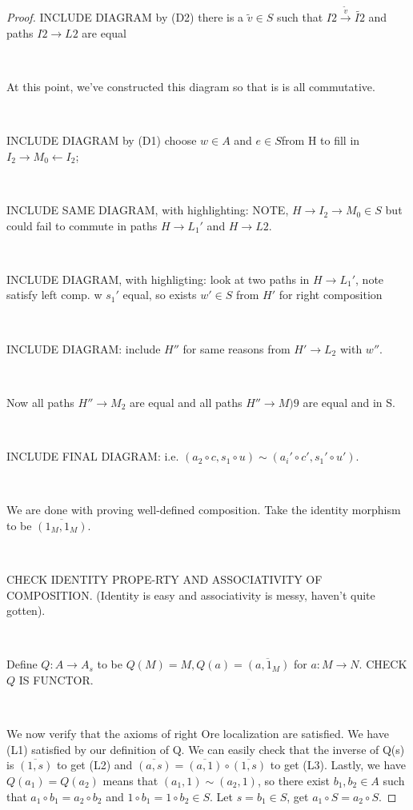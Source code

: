 \documentclass[12pt]{amsart}    %
\theoremstyle{definition}
\begin{document}
\begin{proof}
INCLUDE DIAGRAM by (D2) there is a $\tilde{v} \in S$ such that $I2 \xrightarrow{\tilde{v}} \tilde{I2}$ and paths $I2 \rightarrow L2$ are equal

\

At this point, we've constructed this diagram so that is is all commutative.

\

INCLUDE DIAGRAM by (D1) choose $w \in A$ and $e \in S $from H to fill in $I_2 \rightarrow M_0 \leftarrow I_2$;

\

INCLUDE SAME DIAGRAM, with highlighting: NOTE, $H \rightarrow I_2 \rightarrow M_0 \in S$ but could fail to commute in paths $H \rightarrow L_1'$ and $H \rightarrow L2$.

\

INCLUDE  DIAGRAM, with highligting: look at two paths in $H \rightarrow L_1'$, note satisfy left comp. w $s_1'$ equal, so exists $w' \in S$ from $H'$ for right composition

\

INCLUDE DIAGRAM: include $H''$ for same reasons from $H' \rightarrow L_2$ with $w''$.

\

Now all paths $H'' \rightarrow M_2$ are equal and all paths $H'' \rightarrow M)9$ are equal and in S.

\

INCLUDE FINAL DIAGRAM: i.e. $(a_2 \circ c, s_1 \circ u) \sim (a_i' \circ c', s_1' \circ u')$.

\

We are done with proving well-defined composition.  Take the identity morphism to be $\overline{(1_M,1_M)}$.

\

CHECK IDENTITY PROPE-RTY AND ASSOCIATIVITY OF COMPOSITION. (Identity is easy and associativity is messy, haven't quite gotten).

\

Define $Q: A \rightarrow A_s$ to be $Q(M) = M, Q(a) = \overline{(a,1_M)}$ for $a: M \rightarrow N$.  CHECK $Q$ IS FUNCTOR.

\

We now verify that the axioms of right Ore localization are satisfied.  We have (L1) satisfied by our definition of Q.  We can easily check that the inverse of Q(s) is $\overline{(1,s)}$ to get (L2) and $\overline{(a,s)} = \overline{(a,1)}\circ \overline{(1,s)}$ to get (L3).  Lastly, we have $Q(a_1)  = Q(a_2)$ means that $(a_1, 1) \sim (a_2, 1)$, so there exist $b_1, b_2 \in A$ such that $a_1 \circ b_1 = a_2 \circ b_2$ and $1 \circ b_1 = 1 \circ b_2 \in S$.  Let $s = b_1 \in S$, get $a_1 \circ S = a_2 \circ S$.


\end{proof}
\end{document}
